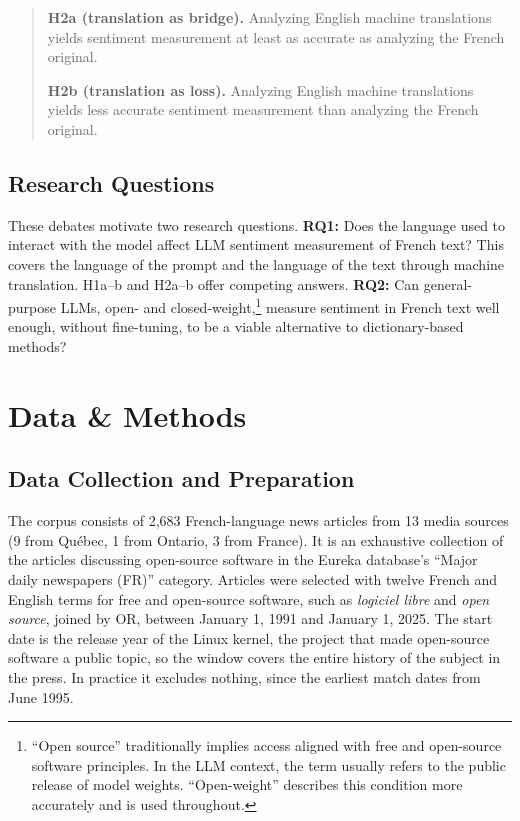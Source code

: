 \documentclass[
  man,
  floatsintext,
  longtable,
  nolmodern,
  notxfonts,
  notimes,
  colorlinks=true,linkcolor=blue,citecolor=blue,urlcolor=blue]{apa7}
\begin{document}
\begin{quote}
\textbf{H2a (translation as bridge).} Analyzing English machine
translations yields sentiment measurement at least as accurate as
analyzing the French original.

\textbf{H2b (translation as loss).} Analyzing English machine
translations yields less accurate sentiment measurement than analyzing
the French original.
\end{quote}

\subsection{Research Questions}\label{research-questions}

These debates motivate two research questions. \textbf{RQ1:} Does the
language used to interact with the model affect LLM sentiment
measurement of French text? This covers the language of the prompt and
the language of the text through machine translation. H1a--b and H2a--b
offer competing answers. \textbf{RQ2:} Can general-purpose LLMs, open-
and closed-weight,\footnote{``Open source'' traditionally implies access
  aligned with free and open-source software principles. In the LLM
  context, the term usually refers to the public release of model
  weights. ``Open-weight'' describes this condition more accurately and
  is used throughout.} measure sentiment in French text well enough,
without fine-tuning, to be a viable alternative to dictionary-based
methods?

\section{Data \& Methods}\label{data-methods}

\subsection{Data Collection and
Preparation}\label{data-collection-and-preparation}

The corpus consists of 2,683 French-language news articles from 13 media
sources (9 from Québec, 1 from Ontario, 3 from France). It is an
exhaustive collection of the articles discussing open-source software in
the Eureka database's ``Major daily newspapers (FR)'' category. Articles
were selected with twelve French and English terms for free and
open-source software, such as \emph{logiciel libre} and \emph{open
source}, joined by OR, between January 1, 1991 and January 1, 2025. The
start date is the release year of the Linux kernel, the project that
made open-source software a public topic, so the window covers the
entire history of the subject in the press. In practice it excludes
nothing, since the earliest match dates from June 1995.
\end{document}
